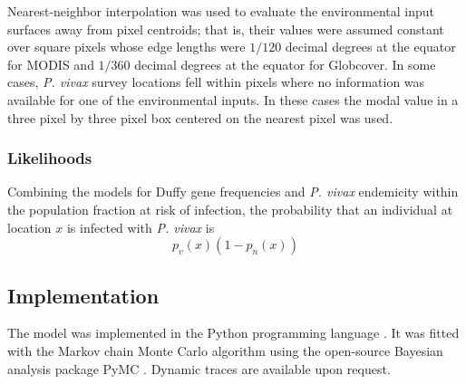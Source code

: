 Nearest-neighbor interpolation was used to evaluate the environmental input surfaces away from pixel centroids; that is, their values were assumed constant over square pixels whose edge lengths were $1/120$ decimal degrees at the equator for MODIS and $1/360$ decimal degrees at the equator for Globcover. In some cases, \emph{P. vivax} survey locations fell within pixels where no information was available for one of the environmental inputs. In these cases the modal value in a three pixel by three pixel box centered on the nearest pixel was used.

\subsubsection*{Likelihoods}
Combining the models for Duffy gene frequencies and \emph{P. vivax} endemicity within the population fraction at risk of infection, the probability that an individual at location $x$ is infected with \emph{P. vivax} is
\begin{equation}
    \label{eq:pv-like}
    p_v(x)(1-p_n(x))
\end{equation}

\subsection*{Implementation} 
The model was implemented in the Python programming language \cite{python}. It was fitted with the Markov chain Monte Carlo algorithm \cite{gilks} using the open-source Bayesian analysis package PyMC \cite{pymc}. Dynamic traces \cite{gilks} are available upon request.